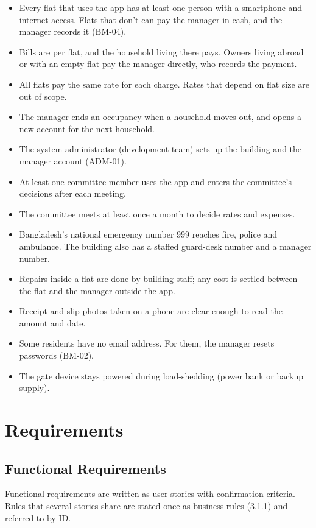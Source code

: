 \documentclass[11pt,a4paper]{report}
\begin{document}
\begin{itemize}
  \item Every flat that uses the app has at least one person with a smartphone and internet access. Flats that don't can pay the manager in cash, and the manager records it (BM-04).
  \item Bills are per flat, and the household living there pays. Owners living abroad or with an empty flat pay the manager directly, who records the payment.
  \item All flats pay the same rate for each charge. Rates that depend on flat size are out of scope.
  \item The manager ends an occupancy when a household moves out, and opens a new account for the next household.
  \item The system administrator (development team) sets up the building and the manager account (ADM-01).
  \item At least one committee member uses the app and enters the committee's decisions after each meeting.
  \item The committee meets at least once a month to decide rates and expenses.
  \item Bangladesh's national emergency number 999 reaches fire, police and ambulance. The building also has a staffed guard-desk number and a manager number.
  \item Repairs inside a flat are done by building staff; any cost is settled between the flat and the manager outside the app.
  \item Receipt and slip photos taken on a phone are clear enough to read the amount and date.
  \item Some residents have no email address. For them, the manager resets passwords (BM-02).
  \item The gate device stays powered during load-shedding (power bank or backup supply).
\end{itemize}

\chapter{Requirements}

\section{Functional Requirements}

Functional requirements are written as user stories with confirmation criteria. Rules that several stories share are stated once as business rules (3.1.1) and referred to by ID.
\end{document}
